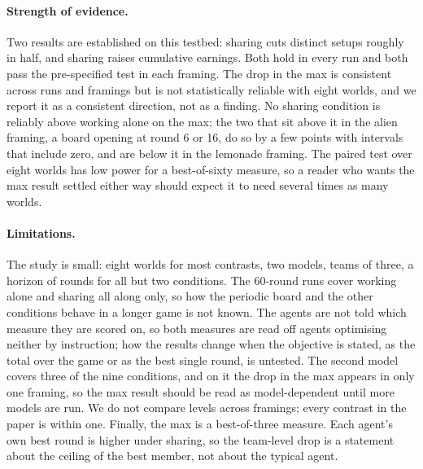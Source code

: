 \paragraph{Strength of evidence.}
Two results are established on this testbed: sharing cuts distinct setups roughly in half, and sharing
raises cumulative earnings. Both hold in every run and both pass the pre-specified test in each framing. The
drop in the max is consistent across runs and framings but is not statistically reliable with eight worlds,
and we report it as a consistent direction, not as a finding. No sharing
condition is reliably above working alone on the max; the two that sit above it in the alien framing, a board
opening at round 6 or 16, do so by a few points with intervals that include zero, and are below it in the
lemonade framing.
The paired test over eight worlds has low power for a best-of-sixty measure, so a reader who wants the max
result settled either way should expect it to need several times as many worlds.

\paragraph{Limitations.}\label{sec:limitations}
The study is small: eight worlds for most contrasts, two models, teams of three, a horizon of \NRounds{}
rounds for all but two conditions. The 60-round runs cover working alone and sharing all along only, so how the
periodic board and the other conditions behave in a longer game is not known. The agents are not told which
measure they are scored on, so both measures are read off agents optimising neither by instruction; how the
results change when the objective is stated, as the total over the game or as the best single round, is
untested. The second model covers
three of
the nine conditions, and on it the drop in the max appears in only one
framing, so the max result should be read as model-dependent until more models are run. We do not compare
levels across framings; every contrast in the paper is within one. Finally, the max is a best-of-three measure. Each agent's own best round is higher
under sharing, so the team-level drop is a statement about the ceiling of the best member, not about the
typical agent.

